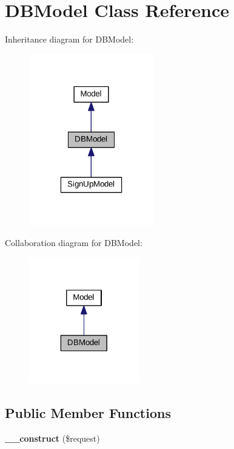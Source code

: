 \hypertarget{classDBModel}{\section{D\+B\+Model Class Reference}
\label{classDBModel}
}


Inheritance diagram for D\+B\+Model\+:\nopagebreak
\begin{figure}[H]
\begin{center}
\leavevmode
\includegraphics[width=154pt]{classDBModel__inherit__graph}
\end{center}
\end{figure}


Collaboration diagram for D\+B\+Model\+:\nopagebreak
\begin{figure}[H]
\begin{center}
\leavevmode
\includegraphics[width=136pt]{classDBModel__coll__graph}
\end{center}
\end{figure}
\subsection*{Public Member Functions}
\begin{DoxyCompactItemize}
\item 
\hypertarget{classDBModel_aa47b45636049892758308453fb27e3cb}{{\bfseries \+\_\+\+\_\+construct} (\$request)}\label{classDBModel_aa47b45636049892758308453fb27e3cb}

\end{DoxyCompactItemize}
